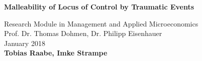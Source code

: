\documentclass[12pt,a4paper,fleqn]{article}
\begin{document}
	\begin{titlepage}
		\begin{center}
			\vspace*{35mm}
			{\bfseries\Large{Malleability of Locus of Control by Traumatic Events}\\
			\vspace{25mm}}
			\begin{spacing}{1.3}
				\large Research Module in Management and Applied Microeconomics\\
				\vspace{65mm}
			   Prof. Dr. Thomas Dohmen, Dr. Philipp Eisenhauer \\
				\vspace{10mm}
				January 2018   \\
				\textbf{Tobias Raabe, Imke Strampe} \\
			\end{spacing}
		\end{center}
	\end{titlepage}
\tableofcontents

\pagebreak

\listoffigures  {} \clearpage
\listoftables  {} \clearpage

\pagebreak

\end{document}
